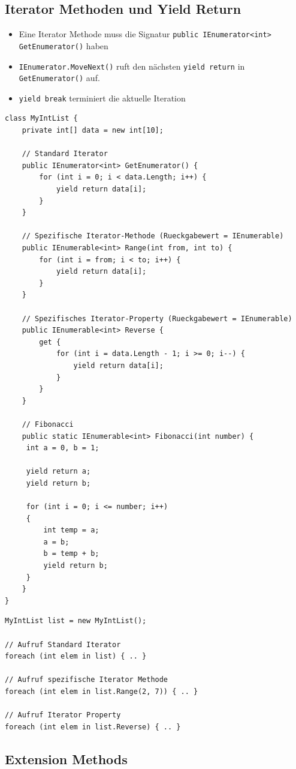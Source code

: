 \documentclass[
a4paper,
oneside,
10pt,
fleqn,
headsepline,
toc=listofnumbered, 
bibliography=totocnumbered]{scrartcl}
\begin{document}
\subsection{Iterator Methoden und Yield Return}
\begin{itemize}
	\item Eine Iterator Methode muss die Signatur \lstinline[]|public IEnumerator<int> GetEnumerator()| haben
	\item \lstinline|IEnumerator.MoveNext()| ruft den nächsten \lstinline|yield return| in \lstinline|GetEnumerator()| auf.
	\item \lstinline|yield break| terminiert die aktuelle Iteration
\end{itemize}
\begin{lstlisting}
class MyIntList {
	private int[] data = new int[10];
	
	// Standard Iterator
	public IEnumerator<int> GetEnumerator() {
		for (int i = 0; i < data.Length; i++) {
			yield return data[i];
		}
	}
	
	// Spezifische Iterator-Methode (Rueckgabewert = IEnumerable)
	public IEnumerable<int> Range(int from, int to) {
		for (int i = from; i < to; i++) {
			yield return data[i];
		}
	}
	
	// Spezifisches Iterator-Property (Rueckgabewert = IEnumerable)
	public IEnumerable<int> Reverse {
		get {
			for (int i = data.Length - 1; i >= 0; i--) {
				yield return data[i];
			}
		}
	}
	
	// Fibonacci
	public static IEnumerable<int> Fibonacci(int number) {
	 int a = 0, b = 1;
	 
	 yield return a;
	 yield return b;
	 
	 for (int i = 0; i <= number; i++)
	 {
		 int temp = a;
		 a = b;
		 b = temp + b;
		 yield return b;
	 }	 
	}
}
\end{lstlisting}

\begin{lstlisting}
MyIntList list = new MyIntList();

// Aufruf Standard Iterator
foreach (int elem in list) { .. }

// Aufruf spezifische Iterator Methode
foreach (int elem in list.Range(2, 7)) { .. }

// Aufruf Iterator Property
foreach (int elem in list.Reverse) { .. }
\end{lstlisting}

\clearpage

\subsection{Extension Methods}
\end{document}
